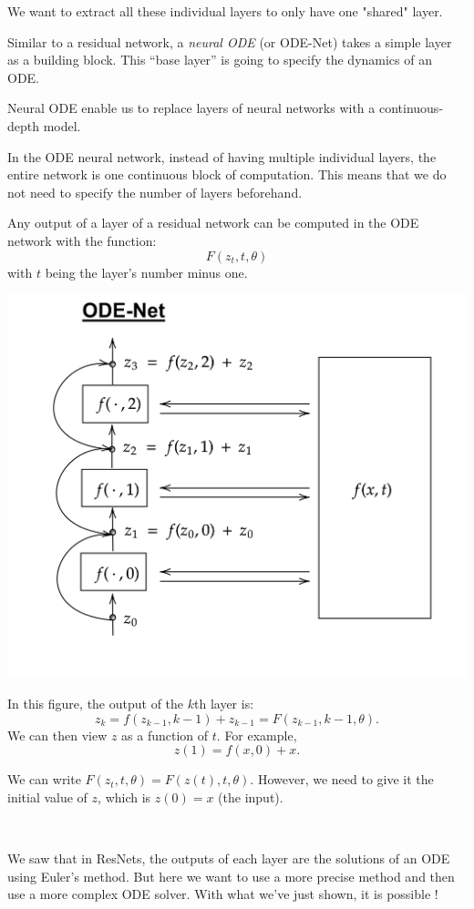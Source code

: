 \documentclass[10pt,a4paper]{article}
\theoremstyle{definition}
\theoremstyle{definition}
\begin{document}
We want to extract all these individual layers to only have one "shared" layer.

Similar to a residual network, a \textit{neural ODE} (or ODE-Net) takes a simple layer as a building block. This “base layer” is going to specify the dynamics of an ODE.

Neural ODE enable us to replace layers of neural networks with a continuous-depth model.

In the ODE neural network, instead of having multiple individual layers, the entire network is one continuous block of computation. This means that we do not need to specify the number of layers beforehand.

Any output of a layer of a residual network can be computed in the ODE network with the function:
$$F(z_t, t, \theta)$$
with $t$ being the layer's number minus one.

\begin{center}
\includegraphics[scale=0.18]{ODENet.png}
\end{center}

In this figure, the output of the $k$th layer is:
$$z_k = f(z_{k-1}, k-1) + z_{k-1} = F(z_{k-1}, k-1, \theta).$$
We can then view $z$ as a function of $t$. For example,
$$z(1) = f(x, 0) + x.$$

We can write $F(z_t, t, \theta) = F(z(t), t, \theta)$. However, we need to give it the initial value of $z$, which is $z(0) = x$ (the input).

~

We saw that in ResNets, the outputs of each layer are the solutions of an ODE using Euler's method. But here we want to use a more precise method and then use a more complex ODE solver. With what we've just shown, it is possible !
\end{document}
